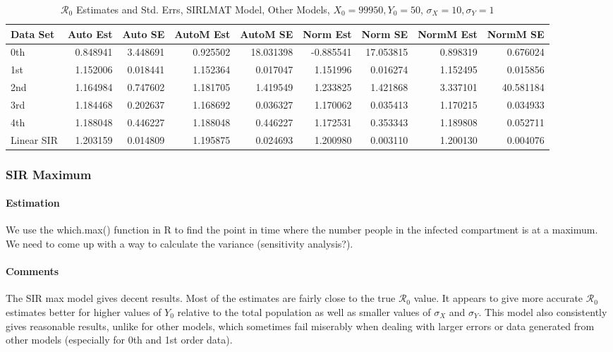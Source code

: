 \documentclass[12pt]{article}
\newcommand{\rr}{\ensuremath{\mathcal{R}_0}}
\begin{document}
\begin{table}[H]
	
	\caption{$\rr$ Estimates and Std. Errs, SIRLMAT Model,
		Other Models, $X_0 = 99950, Y_0 = 50$, 
		$\sigma_X = 10, \sigma_Y = 1$}
	\begin{footnotesize}
		\hskip -1cm
		\begin{tabular}{l|r|r|r|r|r|r|r|r}
			\hline
			Data Set & Auto Est & Auto SE & AutoM Est & AutoM SE & Norm Est & Norm SE & NormM Est & NormM SE\\
			\hline
			0th & 0.848941 & 3.448691 & 0.925502 & 18.031398 & -0.885541 & 17.053815 & 0.898319 & 0.676024\\
			\hline
			1st & 1.152006 & 0.018441 & 1.152364 & 0.017047 & 1.151996 & 0.016274 & 1.152495 & 0.015856\\
			\hline
			2nd & 1.164984 & 0.747602 & 1.181705 & 1.419549 & 1.233825 & 1.421868 & 3.337101 & 40.581184\\
			\hline
			3rd & 1.184468 & 0.202637 & 1.168692 & 0.036327 & 1.170062 & 0.035413 & 1.170215 & 0.034933\\
			\hline
			4th & 1.188048 & 0.446227 & 1.188048 & 0.446227 & 1.172531 & 0.353343 & 1.189808 & 0.052711\\
			\hline
			Linear SIR & 1.203159 & 0.014809 & 1.195875 & 0.024693 & 1.200980 & 0.003110 & 1.200130 & 0.004076\\
			\hline
		\end{tabular}
	\end{footnotesize}
\end{table}

\subsubsection{SIR Maximum}

\paragraph{Estimation}

We use the which.max() function in R to find the point in time where the number people in the infected compartment is at a maximum. We need to come up with a way to calculate the variance (sensitivity analysis?). 

\paragraph{Comments}

The SIR max model gives decent results. Most of the estimates are fairly close to the true $\rr$ value. It appears to give more accurate $\rr$ estimates better for higher values of $Y_0$ relative to the total population as well as smaller values of $\sigma_X$ and $\sigma_Y$. This model also consistently gives reasonable results, unlike for other models, which sometimes fail miserably when dealing with larger errors or data generated from other models (especially for 0th and 1st order data).
\end{document}
